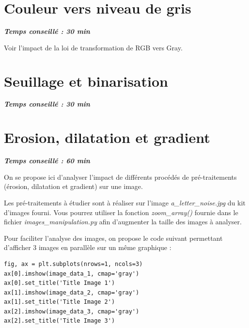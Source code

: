 \documentclass[a4paper,11pt,titlepage]{article} %
\begin{document}
\section{Couleur vers niveau de gris}

\begin{center} \textbf{\textit{Temps conseillé : 30 min}} \end{center}

Voir l'impact de la loi de transformation de RGB vers Gray.


\section{Seuillage et binarisation}

\begin{center} \textbf{\textit{Temps conseillé : 30 min}} \end{center}




\section{Erosion, dilatation et gradient}

\begin{center} \textbf{\textit{Temps conseillé : 60 min}} \end{center}

On se propose ici d'analyser l'impact de différents procédés de pré-traitements (érosion, dilatation et gradient) sur une image.

\medskip

Les pré-traitements à étudier sont à réaliser sur l'image \textsl{a\_letter\_noise.jpg} du kit d'images fourni. Vous pourrez utiliser la fonction \textsl{zoom\_array()} fournie dans le fichier \textsl{images\_manipulation.py} afin d'augmenter la taille des images à analyser. 

\medskip

Pour faciliter l'analyse des images, on propose le code suivant permettant d'afficher 3 images en parallèle sur un même graphique :

\begin{lstlisting}
fig, ax = plt.subplots(nrows=1, ncols=3)    
ax[0].imshow(image_data_1, cmap='gray')
ax[0].set_title('Title Image 1')  
ax[1].imshow(image_data_2, cmap='gray')
ax[1].set_title('Title Image 2')
ax[2].imshow(image_data_3, cmap='gray')
ax[2].set_title('Title Image 3')
\end{lstlisting}
\end{document}
